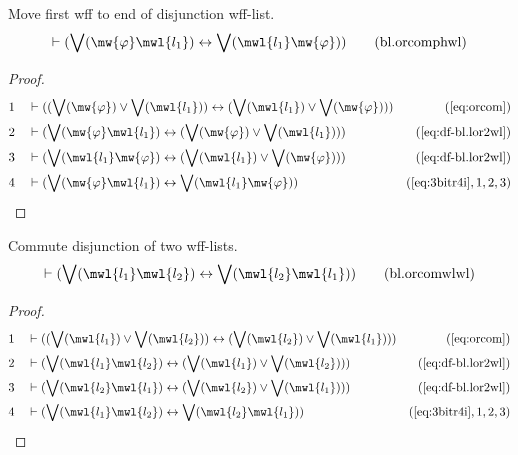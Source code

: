 \begin{lemma} Move first wff to end of disjunction
wff-list.
\begin{align}
\vdash ( \bigvee( \mw{\varphi} \mwl{l_1} ) \leftrightarrow \bigvee( \mwl{l_1}
    \mw{\varphi} ) )\label{eq:bl.orcomphwl}\tag{bl.orcomphwl}
\end{align}
\end{lemma}

\begin{proof}
\begin{align}
  1 &&  & \vdash ( ( \bigvee( \mw{\varphi} ) \vee \bigvee( \mwl{l_1} ) ) \leftrightarrow ( \bigvee( \mwl{l_1} ) \vee \bigvee( \mw{\varphi} ) ) )&(\mbox{\ref{eq:orcom}})\notag
  \\ 2 &&  & \vdash ( \bigvee( \mw{\varphi} \mwl{l_1} ) \leftrightarrow ( \bigvee( \mw{\varphi} ) \vee \bigvee( \mwl{l_1} ) ) )&(\mbox{\ref{eq:df-bl.lor2wl}})\notag
  \\ 3 &&  & \vdash ( \bigvee( \mwl{l_1} \mw{\varphi} ) \leftrightarrow ( \bigvee( \mwl{l_1} ) \vee \bigvee( \mw{\varphi} ) ) )&(\mbox{\ref{eq:df-bl.lor2wl}})\notag
  \\ 4 &&  & \vdash ( \bigvee( \mw{\varphi} \mwl{l_1} ) \leftrightarrow \bigvee( \mwl{l_1} \mw{\varphi} ) )&(\mbox{\ref{eq:3bitr4i}},1,2,3)\notag
\end{align}
\end{proof}

\begin{lemma} Commute disjunction of two wff-lists.
\begin{align}
\vdash ( \bigvee( \mwl{l_1} \mwl{l_2} ) \leftrightarrow \bigvee( \mwl{l_2}
    \mwl{l_1} ) )\label{eq:bl.orcomwlwl}\tag{bl.orcomwlwl}
\end{align}
\end{lemma}

\begin{proof}
\begin{align}
  1 &&  & \vdash ( ( \bigvee( \mwl{l_1} ) \vee \bigvee( \mwl{l_2} ) ) \leftrightarrow ( \bigvee( \mwl{l_2} ) \vee \bigvee( \mwl{l_1} ) ) )&(\mbox{\ref{eq:orcom}})\notag
  \\ 2 &&  & \vdash ( \bigvee( \mwl{l_1} \mwl{l_2} ) \leftrightarrow ( \bigvee( \mwl{l_1} ) \vee \bigvee( \mwl{l_2} ) ) )&(\mbox{\ref{eq:df-bl.lor2wl}})\notag
  \\ 3 &&  & \vdash ( \bigvee( \mwl{l_2} \mwl{l_1} ) \leftrightarrow ( \bigvee( \mwl{l_2} ) \vee \bigvee( \mwl{l_1} ) ) )&(\mbox{\ref{eq:df-bl.lor2wl}})\notag
  \\ 4 &&  & \vdash ( \bigvee( \mwl{l_1} \mwl{l_2} ) \leftrightarrow \bigvee( \mwl{l_2} \mwl{l_1} ) )&(\mbox{\ref{eq:3bitr4i}},1,2,3)\notag
\end{align}
\end{proof}


